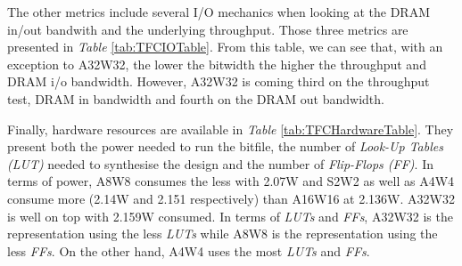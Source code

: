 The other metrics include several I/O mechanics when looking at the DRAM in/out bandwith and the underlying throughput. Those three metrics are presented in \emph{Table} \ref{tab:TFCIOTable}. From this table, we can see that, with an exception to A32W32, the lower the bitwidth the higher the throughput and DRAM i/o bandwidth. However, A32W32 is coming third on the throughput test, DRAM in bandwidth and fourth on the DRAM out bandwidth.

\begin{table}[!htb]
  \centering
\caption[TFC Hardware Utilisation Table]{TFC Hardware Utilisation}
\label{tab:TFCHardwareTable}
\end{table}

Finally, hardware resources are available in \emph{Table} \ref{tab:TFCHardwareTable}. They present both the power needed to run the bitfile, the number of \emph{Look-Up Tables (LUT)} needed to synthesise the design and the number of \emph{Flip-Flops (FF)}. In terms of power, A8W8 consumes the less with 2.07W and S2W2 as well as A4W4 consume more (2.14W and 2.151 respectively) than A16W16 at 2.136W. A32W32 is well on top with 2.159W consumed. In terms of \emph{LUTs} and \emph{FFs}, A32W32 is the representation using the less \emph{LUTs} while A8W8 is the representation using the less \emph{FFs}. On the other hand, A4W4 uses the most \emph{LUTs} and \emph{FFs}.

%
%

